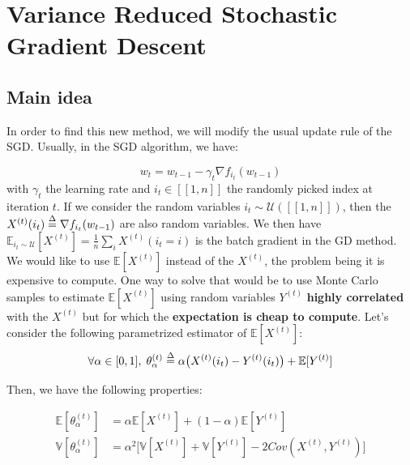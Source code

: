 \documentclass[12pt]{report}
\begin{document}
\section{Variance Reduced Stochastic Gradient Descent}
\subsection{Main idea}

In order to find this new method, we will modify the usual update rule of the SGD. Usually, in the SGD algorithm, we have:

\begin{equation}
    w_{t} = w_{t-1} - \gamma_t \nabla f_{i_t}(w_{t-1})
\end{equation}
with $\gamma_t$ the learning rate and $i_t \in [\![1,n]\!]$ the randomly picked index  at iteration $t$. If we consider the random variables  $i_t \sim \mathcal{U}([\![1,n]\!])$, then the $X^{(t)}(i_t) \mathrel{\stackrel{\Delta}{=}} \nabla f_{i_t}(w_{t-1})$ are also random variables. We then have $\mathbb{E}_{i_t \sim \mathcal{U}}[X^{(t)}] = \frac{1}{n} \sum_i X^{(t)}(i_t=i)$ is the batch gradient in the GD method. We would like to use $\mathbb{E}[X^{(t)}]$ instead of the $X^{(t)}$, the problem being it is expensive to compute. One way to solve that would be to use Monte Carlo samples to estimate $\mathbb{E}[X^{(t)}]$ using random variables $Y^{(t)}$ \textbf{highly correlated} with the $X^{(t)}$ but for which the \textbf{expectation is cheap to compute}. Let's consider the following parametrized estimator of $\mathbb{E}[X^{(t)}]$:
\begin{equation}
    \forall \alpha \in [0,1], \; \theta_{\alpha}^{(t)} \mathrel{\stackrel{\Delta}{=}} \alpha \big(X^{(t)}(i_t)-Y^{(t)}(i_t) \big ) + \mathbb{E}[Y^{(t)}]
\end{equation}

Then, we have the following properties:

\begin{align}
    \mathbb{E}[\theta_{\alpha}^{(t)}] & = \alpha \mathbb{E}[X^{(t)}] +(1-\alpha)\mathbb{E}[Y^{(t)}] \\
    \mathbb{V}[\theta_{\alpha}^{(t)}] & = \alpha^2 \Big[ \mathbb{V}[X^{(t)}] + \mathbb{V}[Y^{(t)}] - 2 Cov(X^{(t)},Y^{(t)}) \Big] 
\end{align}
\end{document}
